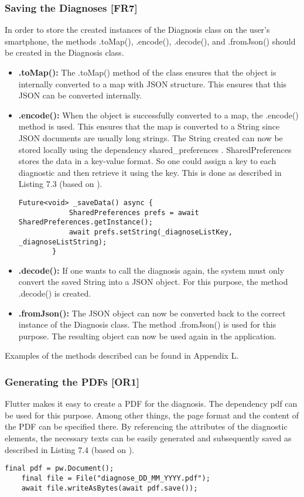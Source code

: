 \subsubsection{Saving the Diagnoses [FR7]}
In order to store the created instances of the Diagnosis class on the user's smartphone, the methods .toMap(), .encode(), .decode(), and .fromJson() should be created in the Diagnosis class.
\begin{itemize}
	\item \textbf{.toMap():}
	\newline
	The .toMap() method of the class ensures that the object is internally converted to a map with JSON structure. This ensures that this JSON can be converted internally.
	\item \textbf{.encode():}
	\newline
	When the object is successfully converted to a map, the .encode() method is used. This ensures that the map is converted to a String since JSON documents are usually long strings. 
	The String created can now be stored locally using the dependency shared\_preferences \cite{.sharedpref}. SharedPreferences stores the data in a key-value format. So one could assign a key to each diagnostic and then retrieve it using the key. This is done as described in Listing 7.3 (based on \cite{.usesharedpref}). 
	\scriptsize
	\begin{lstlisting}[caption=Storing Data to Locally with SharedPreferences]
		Future<void> _saveData() async {
			SharedPreferences prefs = await SharedPreferences.getInstance();
			await prefs.setString(_diagnoseListKey, _diagnoseListString);
		}
	\end{lstlisting}
	\normalsize
	\item \textbf{.decode():}
	\newline
	If one wants to call the diagnosis again, the system must only convert the saved String into a JSON object. For this purpose, the method .decode() is created. 
	\item \textbf{.fromJson():}
	\newline
	The JSON object can now be converted back to the correct instance of the Diagnosis class. The method .fromJson() is used for this purpose. The resulting object can now be used again in the application.
\end{itemize}
Examples of the methods described can be found in Appendix L.
\subsubsection{Generating the PDFs [OR1]}
Flutter makes it easy to create a PDF for the diagnosis. The dependency pdf can be used for this purpose. Among other things, the page format and the content of the PDF can be specified there. By referencing the attributes of the diagnostic elements, the necessary texts can be easily generated and subsequently saved as described in Listing 7.4 (based on \cite{.pdf}).
\scriptsize
\begin{lstlisting}[caption=Saving a PDF]
	final pdf = pw.Document();
	final file = File("diagnose_DD_MM_YYYY.pdf");
	await file.writeAsBytes(await pdf.save());
\end{lstlisting}
\normalsize


